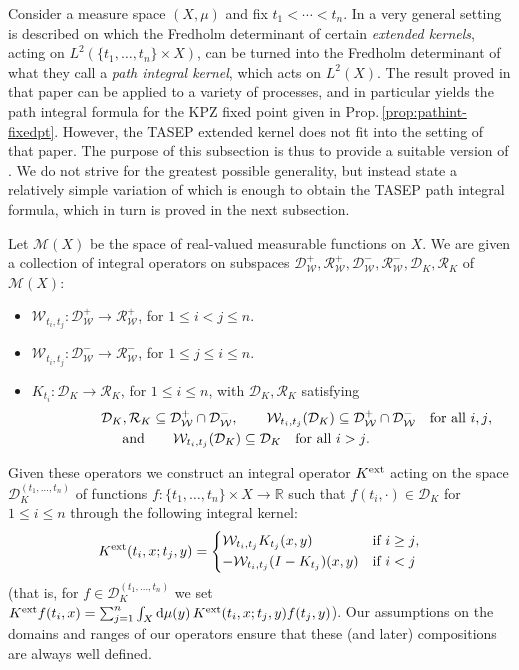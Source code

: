 \documentclass[letterpaper,reqno,11pt,oneside,final]{amsart}
\renewcommand{\labelitemi}{\raisebox{0.075em}{\textendash}}
\theoremstyle{definition}
\newcommand{\rr}{\mathbb{R}}
\newcommand{\cD}{\mathcal{D}}
\newcommand{\cR}{\mathcal{R}}
\newcommand{\cm}{\mathcal{M}}
\newcommand{\uptext}[1]{\text{\upshape{#1}}}
\renewcommand{\d}{\mathrm{d}}
\newcommand{\cw}{\mathcal{W}}
\numberwithin{equation}{section}
\begin{document}
Consider a measure space $(X,\mu)$ and fix $t_1<\dotsm<t_n$.
In \cite[Sec. 3]{bcr} a very general setting is described on which the Fredholm determinant of certain \emph{extended kernels}, acting on $L^2(\{t_1,\dotsc,t_n\}\times X)$, can be turned into the Fredholm determinant of what they call a \emph{path integral kernel}, which acts on $L^2(X)$.
The result proved in that paper can be applied to a variety of processes, and in particular yields the path integral formula for the KPZ fixed point given in Prop.\,\ref{prop:pathint-fixedpt}.
However, the TASEP extended kernel does not fit into the setting of that paper.
The purpose of this subsection is thus to provide a suitable version of \cite[Thm. 3.3]{bcr}.
We do not strive for the greatest possible generality, but instead state a relatively simple variation of \cite{bcr} which is enough to obtain the TASEP path integral formula, which in turn is proved in the next subsection.

Let $\cm(X)$ be the space of real-valued measurable functions on $X$.
We are given a collection of integral operators on subspaces $\cD_\cw^+,\cR_\cw^+,\cD_\cw^-,\cR_\cw^-,\cD_K,\cR_K$ of $\cm(X)$:
\renewcommand{\labelitemi}{$\vcenter{\hbox{\tiny$\bullet$}}$}
\begin{itemize}
\item $\cw_{t_i,t_j}\!:\cD_\cw^+\longrightarrow\cR_\cw^+$, for $1\leq i<j\leq n$.
\item $\cw_{t_i,t_j}\!:\cD_\cw^-\longrightarrow\cR_\cw^-$, for $1\leq j\leq i\leq n$.
\item $K_{t_i}\!:\cD_K\longrightarrow\cR_K$, for $1\leq i\leq n$, with $\cD_K,\cR_K$ satisfying\\[-16pt] 
\begin{multline}
\hskip0.5in\cD_K,\cR_K\subseteq\cD_\cw^+\cap\cD_\cw^-,\qquad\cw_{t_i,t_j}(\cD_K)\subseteq\cD_\cw^+\cap\cD_\cw^-\quad\uptext{for all $i,j$},\\
\uptext{and}\qquad\cw_{t_i,t_j}(\cD_K)\subseteq\cD_K\quad\uptext{for all $i>j$}.\hskip0.5in\label{eq:inclusions}
\end{multline}
\end{itemize}
\renewcommand{\labelitemi}{\textendash}
Given these operators we construct an integral operator $K^\uptext{ext}$ acting on the space $\cD_K^{(t_1,\dotsc,t_n)}$ of functions $f\!:\{t_1,\dotsc,t_n\}\times X\longrightarrow\rr$ such that $f(t_i,\cdot)\in\cD_K$ for $1\leq i\leq n$ through the following integral kernel:
\begin{equation}\label{eq:generalExt}
  K^\uptext{ext}(t_i,x;t_j,y)=
  \begin{dcases*}
    \cw_{t_i,t_j}K_{t_j}(x,y) & if $i\geq j$,\\
    -\cw_{t_i,t_j}(I-K_{t_j})(x,y) & if $i<j$
  \end{dcases*}
\end{equation}
(that is, for $f\in \cD_K^{(t_1,\dotsc,t_n)}$ we set $K^\uptext{ext}f(t_i,x)=\sum_{j=1}^n\int_X\d\mu(y)\,K^\uptext{ext}(t_i,x;t_j,y)f(t_j,y)$).
Our assumptions on the domains and ranges of our operators ensure that these (and later) compositions are always well defined.
\end{document}
